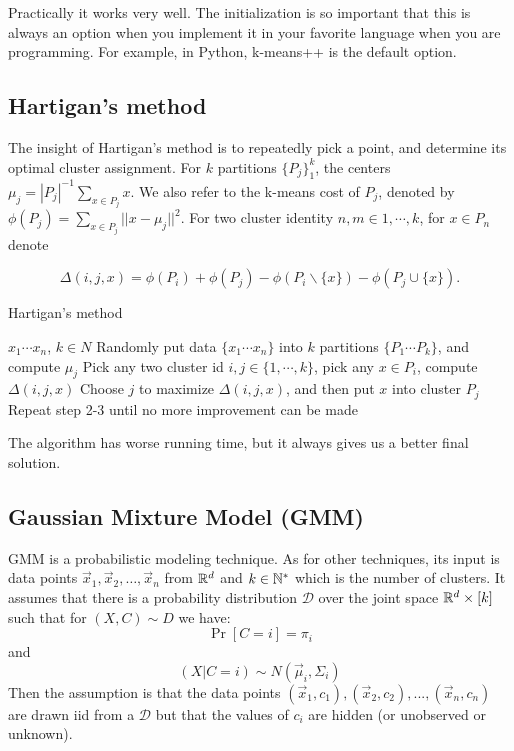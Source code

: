 Practically it works very well. The initialization is so important that this is always an option when you implement it in your favorite language when you are programming. For example, in Python, k-means++ is the default option. 
	
\subsection{Hartigan's method}

The insight of Hartigan's method is to repeatedly pick a point, and determine its optimal cluster assignment. For $k$ partitions $\{P_j\}_1^k$, the centers $\mu_j = |P_j|^{-1} \sum_{x \in P_j}x$. We also refer to the k-means cost of $P_j$, denoted by $\phi(P_j) = \sum_{x \in P_j} ||x-\mu_j||^2$. For two cluster identity $n, m \in {1,\cdots,k}$, for $x \in P_n$ denote

$$\Delta (i,j,x) = \phi(P_i) + \phi(P_j) - \phi(P_i \backslash \{x\}) - \phi(P_j \cup \{x\}).$$

\begin{algorithm}[H]
  \caption{Hartigan's method}
  \label{ladder-mechanism}
  \begin{algorithmic}[1]
    \renewcommand\algorithmicrequire{\textbf{input}} 
    \REQUIRE ${x_1\cdots x_n}$, $k\in N$
    \STATE Randomly put data $\{x_1\cdots x_n\}$ into $k$ partitions $\{P_1\cdots P_k\}$, and compute ${\mu_j}$
    \STATE Pick any two cluster id $i,j \in \{1,\cdots,k\}$, pick any $x \in P_i$, compute $\Delta(i,j,x)$
    \STATE Choose $j$ to maximize $\Delta(i,j,x)$, and then put $x$ into cluster $P_j$
    \STATE Repeat step 2-3 until no more improvement can be made
  \end{algorithmic}
\end{algorithm}

The algorithm has worse running time, but it always gives us a better final solution.

\subsection{Gaussian Mixture Model (GMM)}
  GMM is a probabilistic modeling technique. As for other techniques, its input is data points $\vec{x}_1, \vec{x}_2, \dots, \vec{x}_n$ from $\mathbb{R}^d$ and $k \in \mathbb{N}^*$ which 
  is the number of clusters.
  It assumes that there is a probability distribution $\mathcal{D}$ over the joint space $\mathbb{R}^d \times [k]$ such that for $(X, C) \sim D$ we have:
  $$\Pr[C = i] = \pi_i$$
  and 
  $$(X | C = i) \sim N(\vec{\mu}_i, \Sigma_i) $$
  Then the assumption is that the data points $(\vec{x}_1, c_1), (\vec{x}_2, c_2), ..., (\vec{x}_n, c_n)$ are drawn iid from a $\mathcal{D}$ but
  that the values of $c_i$ are hidden (or unobserved or unknown).
  
